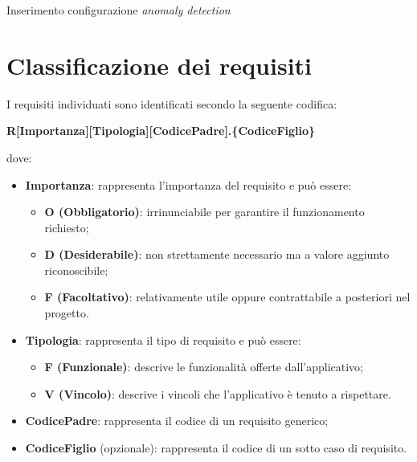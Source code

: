 \begin{usecase}{1}{Inserimento configurazione \textit{anomaly detection}}
\label{uc:configurazione-anomaly-detection}
\end{usecase}

\section{Classificazione dei requisiti}
I requisiti individuati sono identificati secondo la seguente codifica:
\begin{center}
\textbf{R[Importanza][Tipologia][CodicePadre].\{CodiceFiglio\}}\\
\end{center}
dove:


\begin{itemize}
\item {\textbf{Importanza}: rappresenta l'importanza del requisito e può essere:
	\begin{itemize}
	\item {\textbf{O (Obbligatorio)}: irrinunciabile per garantire il funzionamento richiesto;}
	\item {\textbf{D (Desiderabile)}: non strettamente necessario ma a valore aggiunto riconoscibile;}
	\item {\textbf{F (Facoltativo)}: relativamente utile oppure contrattabile a posteriori nel progetto.}
	\end{itemize}
}
\item{\textbf{Tipologia}: rappresenta il tipo di requisito e può essere:
\begin{itemize}
\item \textbf{F (Funzionale)}: descrive le funzionalità  offerte dall'applicativo;
\item \textbf{V (Vincolo)}: descrive i vincoli che l'applicativo è tenuto a rispettare.
\end{itemize}}
\item \textbf{CodicePadre}: rappresenta il codice di un requisito generico;
\item \textbf{CodiceFiglio} (opzionale): rappresenta il codice di un sotto caso di requisito.
\end{itemize}


